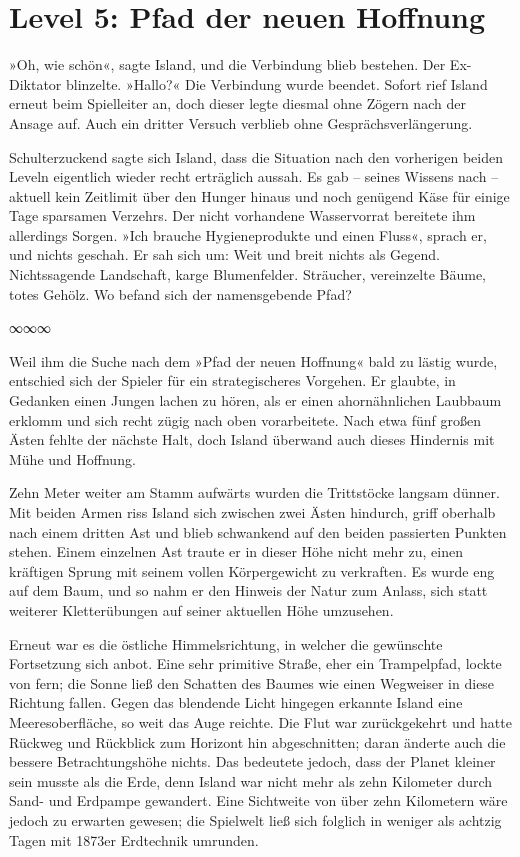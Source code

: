 \section{Level 5: Pfad der neuen Hoffnung}


»Oh, wie schön«, sagte Island, und die Verbindung blieb bestehen. Der Ex-Diktator blinzelte. »Hallo?« Die Verbindung wurde beendet. Sofort rief Island erneut beim Spielleiter an, doch dieser legte diesmal ohne Zögern nach der Ansage auf. Auch ein dritter Versuch verblieb ohne Gesprächsverlängerung.

Schulterzuckend sagte sich Island, dass die Situation nach den vorherigen beiden Leveln eigentlich wieder recht erträglich aussah. Es gab – seines Wissens nach – aktuell kein Zeitlimit über den Hunger hinaus und noch genügend Käse für einige Tage sparsamen Verzehrs. Der nicht vorhandene Wasservorrat bereitete ihm allerdings Sorgen. »Ich brauche Hygieneprodukte und einen Fluss«, sprach er, und nichts geschah. Er sah sich um: Weit und breit nichts als Gegend. Nichtssagende Landschaft, karge Blumenfelder. Sträucher, vereinzelte Bäume, totes Gehölz. Wo befand sich der namensgebende Pfad?

\begin{center}
∞∞∞
\end{center}

Weil ihm die Suche nach dem »Pfad der neuen Hoffnung« bald zu lästig wurde, entschied sich der Spieler für ein strategischeres Vorgehen. Er glaubte, in Gedanken einen Jungen lachen zu hören, als er einen ahornähnlichen Laubbaum erklomm und sich recht zügig nach oben vorarbeitete. Nach etwa fünf großen Ästen fehlte der nächste Halt, doch Island überwand auch dieses Hindernis mit Mühe und Hoffnung.

Zehn Meter weiter am Stamm aufwärts wurden die Trittstöcke langsam dünner. Mit beiden Armen riss Island sich zwischen zwei Ästen hindurch, griff oberhalb nach einem dritten Ast und blieb schwankend auf den beiden passierten Punkten stehen. Einem einzelnen Ast traute er in dieser Höhe nicht mehr zu, einen kräftigen Sprung mit seinem vollen Körpergewicht zu verkraften. Es wurde eng auf dem Baum, und so nahm er den Hinweis der Natur zum Anlass, sich statt weiterer Kletterübungen auf seiner aktuellen Höhe umzusehen.

Erneut war es die östliche Himmelsrichtung, in welcher die gewünschte Fortsetzung sich anbot. Eine sehr primitive Straße, eher ein Trampelpfad, lockte von fern; die Sonne ließ den Schatten des Baumes wie einen Wegweiser in diese Richtung fallen. Gegen das blendende Licht hingegen erkannte Island eine Meeresoberfläche, so weit das Auge reichte. Die Flut war zurückgekehrt und hatte Rückweg und Rückblick zum Horizont hin abgeschnitten; daran änderte auch die bessere Betrachtungshöhe nichts. Das bedeutete jedoch, dass der Planet kleiner sein musste als die Erde, denn Island war nicht mehr als zehn Kilometer durch Sand- und Erdpampe gewandert. Eine Sichtweite von über zehn Kilometern wäre jedoch zu erwarten gewesen; die Spielwelt ließ sich folglich in weniger als achtzig Tagen mit 1873er Erdtechnik umrunden.

